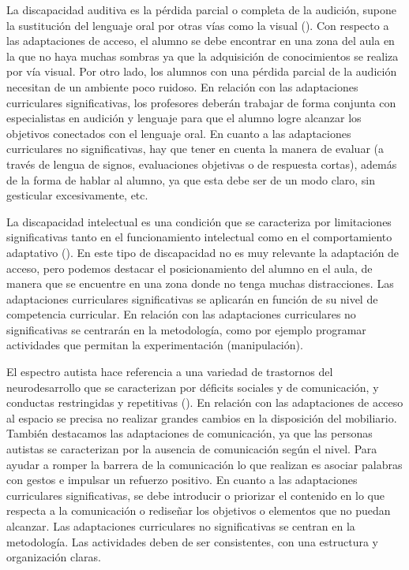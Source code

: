 La discapacidad auditiva es la pérdida parcial o completa de la audición, supone la sustitución del lenguaje oral por otras vías como la visual (\citeauthor{disAuditiva}). Con respecto a las adaptaciones de acceso, el alumno se debe encontrar en una zona del aula en la que no haya muchas sombras ya que la adquisición de conocimientos se realiza por vía visual. Por otro lado, los alumnos con una pérdida parcial de la audición necesitan de un ambiente poco ruidoso. En relación con las adaptaciones curriculares significativas, los profesores deberán trabajar de forma conjunta con especialistas en audición y lenguaje para que el alumno logre alcanzar los objetivos conectados con el lenguaje oral. En cuanto a las adaptaciones curriculares no significativas, hay que tener en cuenta la manera de evaluar (a través de lengua de signos, evaluaciones objetivas o de respuesta cortas), además de la forma de hablar al alumno, ya que esta debe ser de un modo claro, sin gesticular excesivamente, etc.

La discapacidad intelectual es una condición que se caracteriza por limitaciones significativas tanto en el funcionamiento intelectual como en el comportamiento adaptativo (\citeauthor{disIntelectual}). En este tipo de discapacidad no es muy relevante la adaptación de acceso, pero podemos destacar el posicionamiento del alumno en el aula, de manera que se encuentre en una zona donde no tenga muchas distracciones. Las adaptaciones curriculares significativas se aplicarán en función de su nivel de competencia curricular. En relación con las adaptaciones curriculares no significativas se centrarán en la metodología, como por ejemplo programar actividades que permitan la experimentación (manipulación).

El espectro autista hace referencia a una variedad de trastornos del neurodesarrollo que se caracterizan por déficits sociales y de comunicación, y conductas restringidas y repetitivas (\citeauthor{espectroAutista}). En relación con las adaptaciones de acceso al espacio se precisa no realizar grandes cambios en la disposición del mobiliario. También destacamos las adaptaciones de comunicación, ya que las personas autistas se caracterizan por la ausencia de comunicación según el nivel. Para ayudar a romper la barrera de la comunicación lo que realizan es asociar palabras con gestos e impulsar un refuerzo positivo. En cuanto a las adaptaciones curriculares significativas, se debe introducir o priorizar el contenido en lo que respecta a la  comunicación o rediseñar los objetivos o elementos que no puedan alcanzar. Las adaptaciones curriculares no significativas se centran en la metodología. Las actividades deben de ser consistentes, con una estructura y organización claras.

